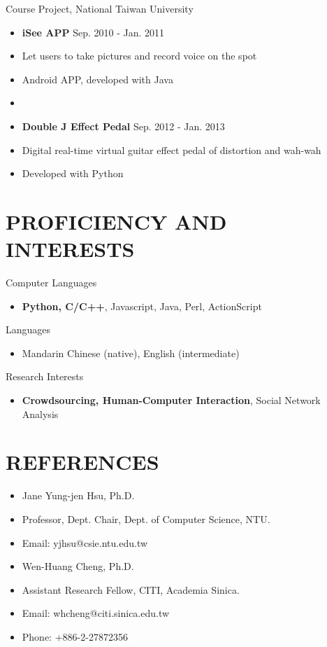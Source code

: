 \documentclass[margin]{main}
\begin{document}
\begin{resume}
Course Project, National Taiwan University
\begin{itemize} \itemsep -2pt
    \item[] {\bf iSee APP} \hfill Sep. 2010 - Jan. 2011
    \item[] Let users to take pictures and record voice on the spot
    \item[] Android APP, developed with Java
    \item[]
    \item[] {\bf Double J Effect Pedal} \hfill Sep. 2012 - Jan. 2013
    \item[] Digital real-time virtual guitar effect pedal of distortion and wah-wah
    \item[] Developed with Python
\end{itemize}

\section{PROFICIENCY AND INTERESTS}
Computer Languages
\begin{itemize} \itemsep -2pt
    \item[] {\bf Python, C/C++}, Javascript, Java, Perl, ActionScript
\end{itemize}

Languages
\begin{itemize} \itemsep -2pt
    \item[] Mandarin Chinese (native), English (intermediate)
\end{itemize}

Research Interests
\begin{itemize} \itemsep -2pt
    \item[] {\bf Crowdsourcing, Human-Computer Interaction}, Social Network Analysis
\end{itemize}

\section{REFERENCES}
\begin{itemize} \itemsep -2pt
    \item[] Jane Yung-jen Hsu, Ph.D.
    \item[] Professor, Dept. Chair, Dept. of Computer Science, NTU.
    \item[] Email: yjhsu@csie.ntu.edu.tw
    \\
    \item[] Wen-Huang Cheng, Ph.D.
    \item[] Assistant Research Fellow, CITI, Academia Sinica.
    \item[] Email: whcheng@citi.sinica.edu.tw
    \item[] Phone: +886-2-27872356
\end{itemize}

\end{resume}
\end{document}
